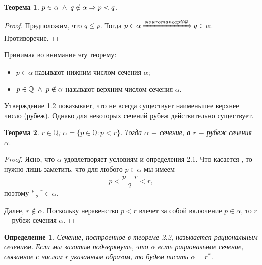 \documentclass{article}
\makeatletter
\newcommand*{\rom}[1]{\expandafter\@slowromancap\romannumeral #1@}
\newtheorem{theorem}{Теорема}[section]
\newtheorem{definition}{Определение}[section]
\makeatother
\begin{document}
\break

\begin{theorem}
\(p \in \alpha \hspace{1mm} \land \hspace{1mm} q \notin \alpha \Rightarrow p < q\).
\end{theorem}

\begin{proof}
Предположим, что \(q \leq p\). Тогда \(p \in \alpha \xRightarrow{\text{\textit{\rom{2}}}} q \in \alpha\). Противоречие. 
\end{proof}

Принимая во внимание эту теорему:
\begin{itemize}
	\item \(p \in \alpha\) называют нижним числом сечения \(\alpha\);
	\item \(p \in \mathbb{Q} \hspace{1mm} \land \hspace{1mm} p \notin \alpha\) называют верхним числом сечения \(\alpha\).
\end{itemize}
 
Утверждение 1.2 показывает, что не всегда существует наименьшее верхнее число (рубеж). Однако для некоторых сечений рубеж действительно существует.

\begin{theorem}
\(r \in \mathbb{Q}\); \(\alpha = \{p \in \mathbb{Q} : p < r\}\). Тогда \(\alpha\) \(-\) сечение, а \(r\) \(-\) рубеж сечения \(\alpha\).
\end{theorem}

\begin{proof}
Ясно, что \(\alpha\) удовлетворяет условиям \text{\textit{\rom{1}}} и  \text{\textit{\rom{2}}} определения 2.1. Что касается \text{\textit{\rom{3}}}, то нужно лишь заметить, что для любого \(p \in \alpha\) мы имеем
\[
p < \frac{p+r}{2} < r,
\]
поэтому \(\frac{p+r}{2} \in \alpha\).

Далее, \(r \notin \alpha\). Поскольку неравенство \(p < r\) влечет за собой включение \(p \in \alpha\), то \(r\) \(-\) рубеж сечения \(\alpha\). 
\end{proof}

\begin{definition}
Сечение, построенное в теореме 2.2, называется рациональным сечением. Если мы захотим подчеркнуть, что \(\alpha\) есть рациональное сечение, связанное с числом \(r\) указанным образом, то будем писать \(\alpha = r^*\).
\end{definition}
\end{document}
